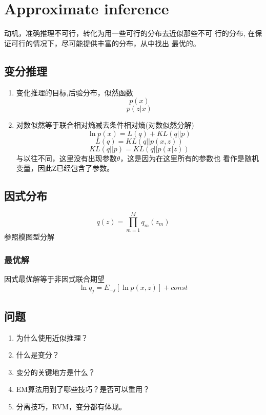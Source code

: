 \chapter{Approximate inference}

动机，准确推理不可行，转化为用一些可行的分布去近似那些不可
行的分布, 在保证可行的情况下，尽可能提供丰富的分布，从中找出
最优的。
\section{变分推理}
\begin{enumerate}
\item 变化推理的目标,后验分布，似然函数
\begin{equation}
p(x)
\end{equation}
\begin{equation}
p(z|x)
\end{equation}

\item 对数似然等于联合相对熵减去条件相对熵(对数似然分解)
\begin{equation}
\ln p(x) = L(q) + KL(q||p)
\end{equation}
\begin{equation}
L(q) = KL(q||p(x,z))
\end{equation}
\begin{equation}
KL(q||p) = KL(q||p(x|z))
\end{equation}
与以往不同，这里没有出现参数$\theta$，这是因为在这里所有的参数也
看作是随机变量，因此Z已经包含了参数。
\end{enumerate}

\section{因式分布}

\begin{equation}
q(z) = \prod_{m=1}^Mq_m(z_m)
\end{equation}
参照模图型分解
\subsection{最优解}
因式最优解等于非因式联合期望
\begin{equation}
\ln q_j = E_{-j}[\ln p(x, z)] + const
\end{equation}

\section{问题}
\begin{enumerate}
\item 为什么使用近似推理？
\item 什么是变分？
\item 变分的关键地方是什么？
\item EM算法用到了哪些技巧？是否可以重用？
\item 分离技巧，RVM，变分都有体现。
\end{enumerate}

